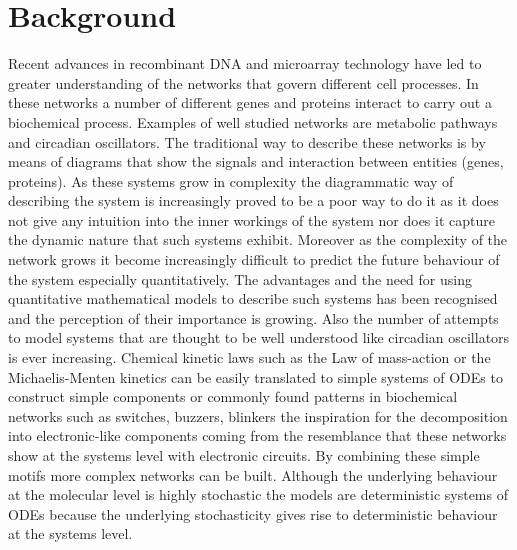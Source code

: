 \documentclass[12pt,a4paper,titlepage]{article}
\begin{document}
\section{Background}
Recent advances in recombinant DNA and microarray technology have led to greater understanding of the networks that govern different cell processes. In these networks a number of different genes and proteins interact to carry out a biochemical process. Examples of well studied networks are metabolic pathways and circadian oscillators\cite{bass2010circadian}. The traditional way to describe these networks is by means of diagrams that show the signals and interaction between entities (genes, proteins). As these systems grow in complexity the diagrammatic way of describing the system is increasingly proved to be a poor way to do it as it does not give any intuition into the inner workings of the system nor does it capture the dynamic nature that such systems exhibit. Moreover as the complexity of the network grows it become increasingly difficult to predict the future behaviour of the system especially quantitatively. The advantages and the need for using  quantitative mathematical models to describe such systems has been recognised and the perception of their importance is growing\cite{lazebnik2002can}. Also the number of attempts to model systems that are thought to be well understood like circadian oscillators is ever increasing\cite{becker2004modeling, mirsky2009model}. Chemical kinetic laws such as the Law of mass-action or the Michaelis-Menten kinetics can be easily translated to simple systems of ODEs to construct simple components or commonly found patterns in biochemical networks such as switches, buzzers, blinkers\cite{tyson2003sniffers} the inspiration for the decomposition into electronic-like components coming from the resemblance that these networks show at the systems level with electronic circuits. By combining these simple motifs more complex networks can be built. Although the underlying behaviour at the molecular level is highly stochastic the models are deterministic systems of ODEs because the underlying stochasticity gives rise to deterministic behaviour at the systems level.
\end{document}
